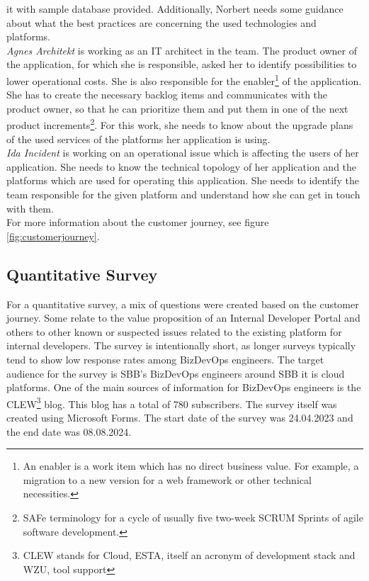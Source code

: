 \documentclass[a4paper,10pt]{article}
\begin{document}
    it with sample database provided.
    Additionally, Norbert needs some guidance about what the best practices are concerning the used technologies and platforms.\\
    \textit{Agnes Architekt} is working as an IT architect in the team.
    The product owner of the application, for which she is responsible, asked her to identify possibilities to lower operational costs.
    She is also responsible for the enabler\footnote{An enabler is a work item which has no direct business value.
    For example, a migration to a new version for a web framework or other technical necessities.} of the application.
    She has to create the necessary backlog items and communicates with the product owner, so that he can prioritize
    them and put them in one of the next product increments\footnote{SAFe terminology for a cycle of usually five two-week SCRUM Sprints of agile software development.}.
    For this work, she needs to know about the upgrade plans of the used services of the platforms her application is using.     \\
    \textit{Ida Incident} is working on an operational issue which is affecting the users of her application.
    She needs to know the technical topology of her application and the platforms which are used for operating this application.
    She needs to identify the team responsible for the given platform and understand how she can get in touch with them.\\
    For more information about the customer journey, see figure \ref{fig:customerjourney}.

    \subsection{Quantitative Survey}
    \label{subsec:quansur}
    For a quantitative survey, a mix of questions were created based on the customer journey.
    Some relate to the value proposition of an Internal Developer Portal and others to other known or suspected issues
    related to the existing platform for internal developers.
    The survey is intentionally short, as longer surveys typically tend to show low response rates among BizDevOps engineers.
    The target audience for the survey is SBB's BizDevOps engineers around SBB it is cloud platforms.
    One of the main sources of information for BizDevOps engineers is the CLEW\footnote{CLEW stands for Cloud, ESTA,
        itself an acronym of development stack and WZU, tool support} blog.
    This blog has a total of 780 subscribers.
    The survey itself was created using Microsoft Forms.
    The start date of the survey was 24.04.2023 and the end date was 08.08.2024.
\end{document}
